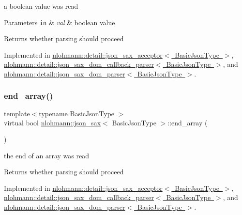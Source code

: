 a boolean value was read 


\begin{DoxyParams}[1]{Parameters}
\mbox{\tt in}  & {\em val} & boolean value \\
\hline
\end{DoxyParams}
\begin{DoxyReturn}{Returns}
whether parsing should proceed 
\end{DoxyReturn}


Implemented in \mbox{\hyperlink{classnlohmann_1_1detail_1_1json__sax__acceptor_ac629bf4f75f489f101d9cd08ffb21d90}{nlohmann\+::detail\+::json\+\_\+sax\+\_\+acceptor$<$ Basic\+Json\+Type $>$}}, \mbox{\hyperlink{classnlohmann_1_1detail_1_1json__sax__dom__callback__parser_a945cb4ac399dad288ad31a67f26590a2}{nlohmann\+::detail\+::json\+\_\+sax\+\_\+dom\+\_\+callback\+\_\+parser$<$ Basic\+Json\+Type $>$}}, and \mbox{\hyperlink{classnlohmann_1_1detail_1_1json__sax__dom__parser_a8746e803df6c21cde68662bc707aba84}{nlohmann\+::detail\+::json\+\_\+sax\+\_\+dom\+\_\+parser$<$ Basic\+Json\+Type $>$}}.

\mbox{\label{structnlohmann_1_1json__sax_a235ee975617f28e6a996d1e36a282312}} 
\subsubsection{\texorpdfstring{end\+\_\+array()}{end\_array()}}
{\footnotesize\ttfamily template$<$typename Basic\+Json\+Type $>$ \\
virtual bool \mbox{\hyperlink{structnlohmann_1_1json__sax}{nlohmann\+::json\+\_\+sax}}$<$ Basic\+Json\+Type $>$\+::end\+\_\+array (\begin{DoxyParamCaption}{ }\end{DoxyParamCaption})\hspace{0.3cm}{\ttfamily [pure virtual]}}



the end of an array was read 

\begin{DoxyReturn}{Returns}
whether parsing should proceed 
\end{DoxyReturn}


Implemented in \mbox{\hyperlink{classnlohmann_1_1detail_1_1json__sax__acceptor_a32579cf8b5dda19a09810f4d6f9ff9af}{nlohmann\+::detail\+::json\+\_\+sax\+\_\+acceptor$<$ Basic\+Json\+Type $>$}}, \mbox{\hyperlink{classnlohmann_1_1detail_1_1json__sax__dom__callback__parser_ad708f4730851caff42097dc59e610e6d}{nlohmann\+::detail\+::json\+\_\+sax\+\_\+dom\+\_\+callback\+\_\+parser$<$ Basic\+Json\+Type $>$}}, and \mbox{\hyperlink{classnlohmann_1_1detail_1_1json__sax__dom__parser_aa6abf5a95889056d92d6af63a831b854}{nlohmann\+::detail\+::json\+\_\+sax\+\_\+dom\+\_\+parser$<$ Basic\+Json\+Type $>$}}.

